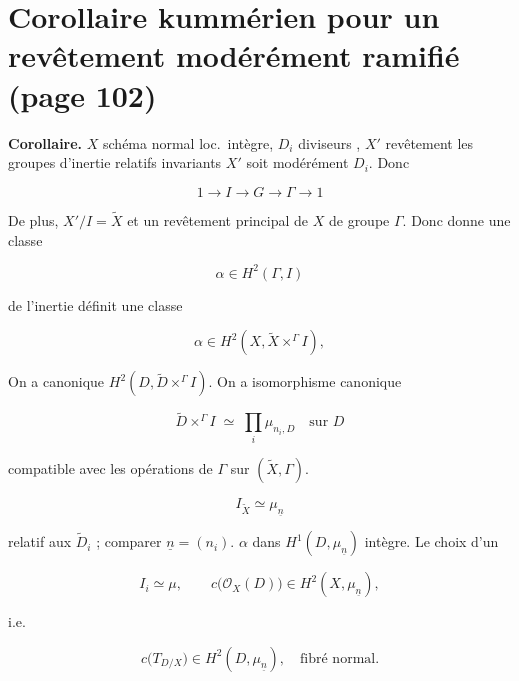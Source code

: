 \documentclass[11pt,a4paper]{article}
\begin{document}
\section*{Corollaire kummérien pour un revêtement modérément ramifié (page 102)}



\textbf{Corollaire.} $X$ schéma normal  loc.\ intègre, $D_{i}$
diviseurs   \ill{}, $X'$ revêtement
 \ill{} \ill{} les groupes d'inertie \ill{} relatifs \ill{}
invariants \ill{} \ill{} $X'$ soit modérément \ill{} $D_{i}$. Donc \ill{}

\[ 1 \longrightarrow I \longrightarrow G \longrightarrow \Gamma \longrightarrow
1 \]

 De plus, $X'/I = \tilde{X}$ et \ill{} un
revêtement principal de $X$ de groupe $\Gamma$. Donc \ill{} donne une classe

\[ \alpha \in H^{2}(\Gamma, I) \]

\ill{} de l'inertie \ill{} définit une classe

\[ \alpha \in H^{2}(X, \tilde{X} \times^{\Gamma} I), \]

 On a \ill{} canonique \ill{} $H^{2}(D, \tilde{D}
\times^{\Gamma} I)$. On a \ill{} isomorphisme canonique

\[ \tilde{D} \times^{\Gamma} I \;\simeq\; \prod_{i} \mu_{n_{i}, D} \quad
\text{sur } D \]

\ill{} compatible avec les opérations de $\Gamma$ \ill{} sur $(\tilde{X},
\Gamma)$. \ill{}

\[ I_{\tilde{X}} \simeq \mu_{\underline{n}} \]

relatif aux $\tilde{D}_{i}$ ; comparer $\underline{n} = (n_{i})$. \ill{}
$\alpha$ dans $H^{1}(D, \mu_{\underline{n}})$ \ill{} intègre. Le choix d'un
\ill{}

\[ I_{i} \simeq \mu, \qquad c\big(\mathcal{O}_{X}(D)\big) \in H^{2}(X,
\mu_{\underline{n}}), \]

i.e.

\[ c\big(T_{D/X}\big) \in H^{2}(D, \mu_{\underline{n}}), \quad \text{fibré
normal.} \]
\end{document}
